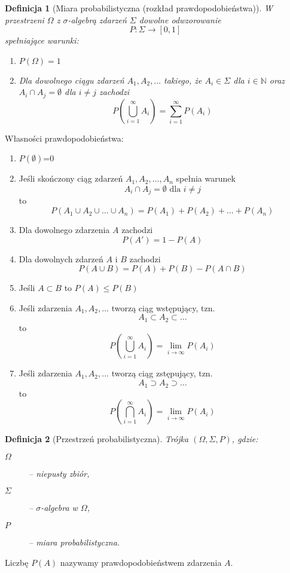 \documentclass[11pt, leqno]{scrartcl}
\theoremstyle{mydefinition}
\newtheorem{definition}{Definicja}[subsection]
\theoremstyle{mytheorem}
\begin{document}
    \begin{definition}[Miara probabilistyczna (rozkład
        prawdopodobieństwa)]
        W przestrzeni $\Omega$ z $\sigma$-algebrą zdarzeń $\Sigma$
        dowolne odwzorowanie
        \[
            P:\Sigma \to [0,1]
        \]
        spełniające warunki:
        \begin{enumerate}
            \item $P(\Omega)=1$
            \item Dla dowolnego ciągu zdarzeń $A_1,A_2,\dots$ takiego,
                że $A_i \in \Sigma$ dla $i \in \mathbb{N}$ oraz
                $A_i \cap A_j=\emptyset$ dla $i \neq j$ zachodzi
                \[
                    P\left(\bigcup_{i=1}^{\infty}A_i\right)=
                    \sum_{i=1}^{\infty}P(A_i)
                \]
        \end{enumerate}
    \end{definition}
    Własności prawdopodobieństwa:
    \begin{enumerate}
        \item $P(\emptyset)$=0
        \item Jeśli skończony ciąg zdarzeń $A_1,A_2,\dots,A_n$ spełnia
            warunek
            \[
                A_i \cap A_j = \emptyset \text{ dla }i \neq j
            \]
            to
            \[
                P(A_1 \cup A_2 \cup \dots \cup A_n)=
                P(A_1)+P(A_2)+\dots +P(A_n)
            \]
        \item Dla dowolnego zdarzenia $A$ zachodzi
            \[
                P(A')=1-P(A)
            \]
        \item Dla dowolnych zdarzeń $A$ i $B$ zachodzi
            \[
                P(A \cup B)=P(A)+P(B)-P(A \cap B)
            \]
        \item Jeśli $A \subset B$ to $P(A)\leq P(B)$
        \item Jeśli zdarzenia $A_1,A_2,\dots$ tworzą ciąg
            wstępujący, tzn.
            \[
                A_1 \subset A_2 \subset \dots
            \]
            to
            \[
                P\left( \bigcup_{i=1}^{\infty}A_i \right)=
                \lim_{i \to \infty}P(A_i)
            \]
        \item Jeśli zdarzenia $A_1,A_2,\dots$ tworzą ciąg
            zstępujący, tzn.
            \[
                A_1 \supset A_2 \supset \dots
            \]
            to
            \[
                P\left( \bigcap_{i=1}^{\infty}A_i \right)=
                \lim_{i \to \infty}P(A_i)
            \]
    \end{enumerate}
    \begin{definition}[Przestrzeń probabilistyczna]
        Trójka $(\Omega,\Sigma,P)$, gdzie:
        \begin{description}
            \item[$\Omega$] -- niepusty zbiór,
            \item[$\Sigma$] -- $\sigma$-algebra w $\Omega$,
            \item[$P$] -- miara probabilistyczna.
        \end{description}
    \end{definition}
    Liczbę $P(A)$ nazywamy prawdopodobieństwem zdarzenia $A$.
\end{document}
